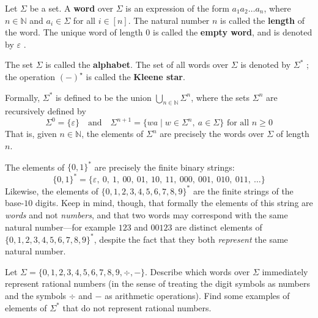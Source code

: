 \begin{definition}
\label{defKleeneStar}
Let $\Sigma$ be a set. A \textbf{word} over $\Sigma$ is an expression of the form $a_1 a_2 \dots a_n$, where $n \in \mathbb{N}$ and $a_i \in \Sigma$ for all $i \in [n]$. The natural number $n$ is called the \textbf{length} of the word. The unique word of length $0$ is called the \textbf{empty word}, and is denoted by $\varepsilon$ .

The set $\Sigma$ is called the \textbf{alphabet}. The set of all words over $\Sigma$ is denoted by $\Sigma^*$ ; the operation $(-)^{\star}$ is called the \textbf{Kleene star}.
\end{definition}

Formally, $\Sigma^*$ is defined to be the union $\displaystyle\bigcup_{n \in \mathbb{N}} \Sigma^n$, where the sets $\Sigma^n$ are recursively defined by
\[ \Sigma^0 = \{ \varepsilon \} \quad \text{and} \quad \Sigma^{n+1} = \{ wa \mid w \in \Sigma^n,~ a \in \Sigma \} \text{ for all } n \ge 0 \]
That is, given $n \in \mathbb{N}$, the elements of $\Sigma^n$ are precisely the words over $\Sigma$ of length $n$.

\begin{example}
\label{exSomeExamplesOfFiniteStrings}
The elements of $\{ 0,1 \}^*$ are precisely the finite binary strings:
\[ \{ 0,1 \}^* = \{ \varepsilon,~ 0,~ 1,~ 00,~ 01,~ 10,~ 11,~ 000,~ 001,~ 010,~ 011,~ \dots \} \]
Likewise, the elements of $\{ 0,1,2,3,4,5,6,7,8,9 \}^*$ are the finite strings of the base-$10$ digits. Keep in mind, though, that formally the elements of this string are \textit{words} and not \textit{numbers}, and that two words may correspond with the same natural number---for example $123$ and $00123$ are distinct elements of $\{ 0,1,2,3,4,5,6,7,8,9 \}^*$, despite the fact that they both \textit{represent} the same natural number.
\end{example}

\begin{exercise}
Let $\Sigma = \{ 0,1,2,3,4,5,6,7,8,9,{\div},{-} \}$. Describe which words over $\Sigma$ immediately represent rational numbers (in the sense of treating the digit symbols as numbers and the symbols $\div$ and $-$ as arithmetic operations). Find some examples of elements of $\Sigma^*$ that do not represent rational numbers.
\end{exercise}

